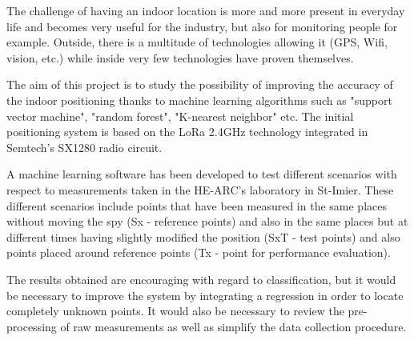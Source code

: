 The challenge of having an indoor location is more and more present in everyday life and becomes very useful for the industry, but also for monitoring people for example. Outside, there is a multitude of technologies allowing it (GPS, Wifi, vision, etc.) while inside very few technologies have proven themselves.

The aim of this project is to study the possibility of improving the accuracy of the indoor positioning thanks to machine learning algorithms such as "support vector machine", "random forest", "K-nearest neighbor" etc. The initial positioning system is based on the LoRa 2.4GHz technology integrated in Semtech's SX1280 radio circuit.

A machine learning software has been developed to test different scenarios with respect to measurements taken in the HE-ARC's laboratory in St-Imier. These different scenarios include points that have been measured in the same places without moving the spy (Sx - reference points) and also in the same places but at different times having slightly modified the position (SxT - test points) and also points placed around reference points (Tx - point for performance evaluation).

The results obtained are encouraging with regard to classification, but it would be necessary to improve the system by integrating a regression in order to locate completely unknown points. It would also be necessary to review the pre-processing of raw measurements as well as simplify the data collection procedure.
